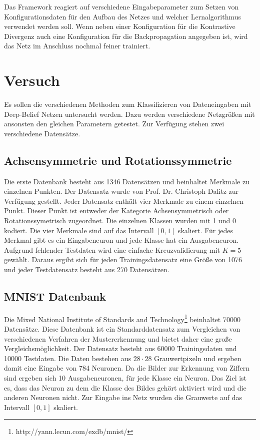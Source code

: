 \documentclass[12pt]{article}
\begin{document}
Das Framework reagiert auf verschiedene Eingabeparameter zum Setzen von Konfigurationsdaten für den Aufbau des Netzes und welcher Lernalgorithmus verwendet werden soll. Wenn neben einer Konfiguration für die Kontrastive Divergenz auch eine Konfiguration für die Backpropagation angegeben ist, wird das Netz im Anschluss nochmal feiner trainiert.

\section{Versuch}
Es sollen die verschiedenen Methoden zum Klassifizieren von Dateneingaben mit Deep-Belief Netzen untersucht werden. Dazu werden verschiedene Netzgrößen mit ansonsten den gleichen Parametern getestet. Zur Verfügung stehen zwei verschiedene Datensätze.
\subsection{Achsensymmetrie und Rotationssymmetrie}
Die erste Datenbank besteht aus 1346 Datensätzen und beinhaltet Merkmale zu einzelnen Punkten. Der Datensatz wurde von  Prof. Dr. Christoph Dalitz zur Verfügung gestellt. Jeder Datensatz enthält vier Merkmale zu einem einzelnen Punkt. Dieser Punkt ist entweder der Kategorie Achsensymmetrisch oder Rotationssymetrisch zugeordnet. Die einzelnen Klassen wurden mit 1 und 0 kodiert. Die vier Merkmale sind auf das Intervall $[0,1]$ skaliert. Für jedes Merkmal gibt es ein Eingabeneuron und jede Klasse hat ein Ausgabeneuron. Aufgrund fehlender Testdaten wird eine einfache Kreuzvalidierung mit $K=5$ gewählt.  Daraus ergibt sich für jeden Trainingsdatensatz eine Größe von 1076 und jeder Testdatensatz besteht aus 270 Datensätzen.

\subsection{MNIST Datenbank}
Die Mixed National Institute of Standards and Technology\footnote{http://yann.lecun.com/exdb/mnist/} beinhaltet 70000 Datensätze. Diese Datenbank ist ein Standarddatensatz zum Vergleichen von verschiedenen Verfahren der Mustererkennung und bietet daher eine große Vergleichsmöglichkeit. Der Datensatz besteht aus 60000 Trainingsdaten und 10000 Testdaten. Die Daten bestehen aus $28 \cdot 28$ Grauwertpixeln und ergeben damit eine Eingabe von 784 Neuronen. Da die Bilder zur Erkennung von Ziffern sind ergeben sich 10 Ausgabeneuronen, für jede Klasse ein Neuron. Das Ziel ist es, dass das Neuron zu dem die Klasse des Bildes gehört aktiviert wird und die anderen Neuronen nicht. Zur Eingabe ins Netz wurden die Grauwerte auf das Intervall $[0,1]$ skaliert.
\newpage
\end{document}
